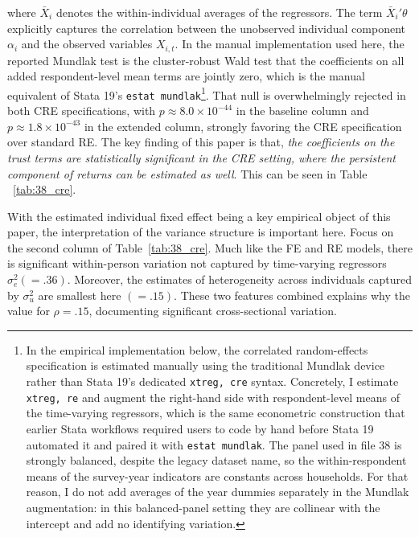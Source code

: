 \par where $\bar{X}_i$ denotes the within-individual averages of the regressors. The term $\bar{X}_i'\theta$ explicitly captures the correlation between the unobserved individual component $\alpha_i$ and the observed variables $X_{i,t}$. In the manual implementation used here, the reported Mundlak test is the cluster-robust Wald test that the coefficients on all added respondent-level mean terms are jointly zero, which is the manual equivalent of Stata 19's \texttt{estat mundlak}\footnote{In the empirical implementation below, the correlated random-effects specification is estimated manually using the traditional Mundlak device rather than Stata 19's dedicated \texttt{xtreg, cre} syntax. Concretely, I estimate \texttt{xtreg, re} and augment the right-hand side with respondent-level means of the time-varying regressors, which is the same econometric construction that earlier Stata workflows required users to code by hand before Stata 19 automated it and paired it with \texttt{estat mundlak}. The panel used in file 38 is strongly balanced, despite the legacy dataset name, so the within-respondent means of the survey-year indicators are constants across households. For that reason, I do not add averages of the year dummies separately in the Mundlak augmentation: in this balanced-panel setting they are collinear with the intercept and add no identifying variation.}. That null is overwhelmingly rejected in both CRE specifications, with $p \approx 8.0\times 10^{-44}$ in the baseline column and $p \approx 1.8\times 10^{-43}$ in the extended column, strongly favoring the CRE specification over standard RE. The key finding of this paper is that, \textit{the coefficients on the trust terms are statistically significant in the CRE setting, where the persistent component of returns can be estimated as well}. This can be seen in Table ~\ref{tab:38_cre}.

\par With the estimated individual fixed effect being a key empirical object of this paper, the interpretation of the variance structure is important here. Focus on the second column of Table~\ref{tab:38_cre}. Much like the FE and RE models, there is significant within-person variation not captured by time-varying regressors $\sigma_e^2(=.36)$. Moreover, the estimates of heterogeneity across individuals captured by $\sigma_u^2$ are smallest here $(=.15)$. These two features combined explains why the value for $\rho=.15$, documenting significant cross-sectional variation.

